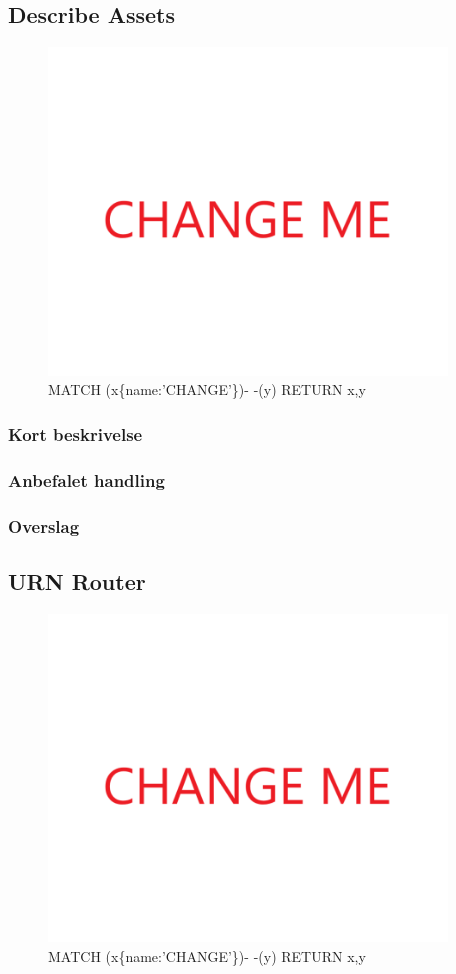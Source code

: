 \documentclass{article}
\begin{document}
\subsection{Describe Assets}
\begin{figure}[h]
\includegraphics[width=300pt]{CHANGE.PNG}
\caption{MATCH (x\{name:'CHANGE'\})- -(y) RETURN x,y}
\end{figure}
\subsubsection{Kort beskrivelse}
\subsubsection{Anbefalet handling}
\subsubsection{Overslag}


\subsection{URN Router}
\begin{figure}[h]
\includegraphics[width=300pt]{CHANGE.PNG}
\caption{MATCH (x\{name:'CHANGE'\})- -(y) RETURN x,y}
\end{figure}
\end{document}
